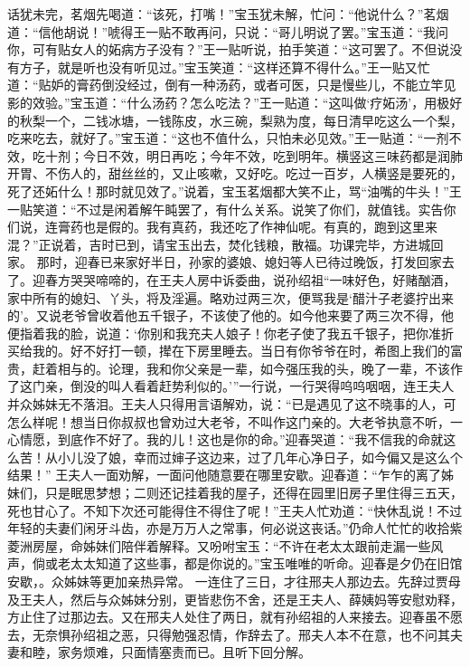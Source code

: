 \documentclass[12pt,oneside]{book}
\begin{document}
话犹未完，茗烟先喝道：“该死，打嘴！”宝玉犹未解，忙问：“他说什么？”茗烟道：“信他胡说！”唬得王一贴不敢再问，只说：“哥儿明说了罢。”宝玉道：“我问你，可有贴女人的妬病方子没有？”王一贴听说，拍手笑道：“这可罢了。不但说没有方子，就是听也没有听见过。”宝玉笑道：“这样还算不得什么。”王一贴又忙道：“贴妒的膏药倒没经过，倒有一种汤药，或者可医，只是慢些儿，不能立竿见影的效验。”宝玉道：“什么汤药？怎么吃法？”王一贴道：“这叫做‘疗妬汤’，用极好的秋梨一个，二钱冰塘，一钱陈皮，水三碗，梨熟为度，每日清早吃这么一个梨，吃来吃去，就好了。”宝玉道：“这也不值什么，只怕未必见效。”王一贴道：“一剂不效，吃十剂；今日不效，明日再吃；今年不效，吃到明年。横竖这三味药都是润肺开胃、不伤人的，甜丝丝的，又止咳嗽，又好吃。吃过一百岁，人横竖是要死的，死了还妬什么！那时就见效了。”说着，宝玉茗烟都大笑不止，骂“油嘴的牛头！”王一贴笑道：“不过是闲着解午盹罢了，有什么关系。说笑了你们，就值钱。实告你们说，连膏药也是假的。我有真药，我还吃了作神仙呢。有真的，跑到这里来混？”正说着，吉时已到，请宝玉出去，焚化钱粮，散福。功课完毕，方进城回家。
那时，迎春已来家好半日，孙家的婆娘、媳妇等人已待过晚饭，打发回家去了。迎春方哭哭啼啼的，在王夫人房中诉委曲，说孙绍祖“一味好色，好赌酗酒，家中所有的媳妇、丫头，将及淫遍。略劝过两三次，便骂我是‘醋汁子老婆拧出来的’。又说老爷曾收着他五千银子，不该使了他的。如今他来要了两三次不得，他便指着我的脸，说道：‘你别和我充夫人娘子！你老子使了我五千银子，把你准折买给我的。好不好打一顿，撵在下房里睡去。当日有你爷爷在时，希图上我们的富贵，赶着相与的。论理，我和你父亲是一辈，如今强压我的头，晚了一辈，不该作了这门亲，倒没的叫人看着赶势利似的。’”一行说，一行哭得呜呜咽咽，连王夫人并众姊妹无不落泪。王夫人只得用言语解劝，说：“已是遇见了这不晓事的人，可怎么样呢！想当日你叔叔也曾劝过大老爷，不叫作这门亲的。大老爷执意不听，一心情愿，到底作不好了。我的儿！这也是你的命。”迎春哭道：“我不信我的命就这么苦！从小儿没了娘，幸而过婶子这边来，过了几年心净日子，如今偏又是这么个结果！”
王夫人一面劝解，一面问他随意要在哪里安歇。迎春道：“乍乍的离了姊妹们，只是眠思梦想；二则还记挂着我的屋子，还得在园里旧房子里住得三五天，死也甘心了。不知下次还可能得住不得住了呢！”王夫人忙劝道：“快休乱说！不过年轻的夫妻们闲牙斗齿，亦是万万人之常事，何必说这丧话。”仍命人忙忙的收拾紫菱洲房屋，命姊妹们陪伴着解释。又吩咐宝玉：“不许在老太太跟前走漏一些风声，倘或老太太知道了这些事，都是你说的。”宝玉唯唯的听命。迎春是夕仍在旧馆安歇，。众姊妹等更加亲热异常。
一连住了三日，才往邢夫人那边去。先辞过贾母及王夫人，然后与众姊妹分别，更皆悲伤不舍，还是王夫人、薛姨妈等安慰劝释，方止住了过那边去。又在邢夫人处住了两日，就有孙绍祖的人来接去。迎春虽不愿去，无奈惧孙绍祖之恶，只得勉强忍情，作辞去了。邢夫人本不在意，也不问其夫妻和睦，家务烦难，只面情塞责而已。且听下回分解。
\end{document}
